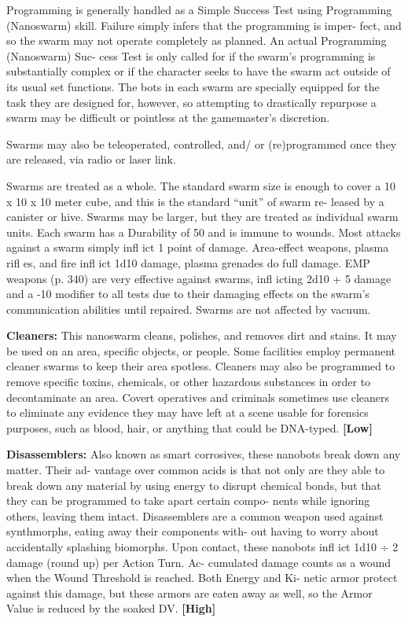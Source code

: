 Programming is generally handled as a Simple 
Success Test using Programming (Nanoswarm) skill. 
Failure simply infers that the programming is imper-
fect, and so the swarm may not operate completely as 
planned. An actual Programming (Nanoswarm) Suc-
cess Test is only called for if the swarm's programming 
is substantially complex or if the character seeks to 
have the swarm act outside of its usual set functions. 
The bots in each swarm are specially equipped for the 
task they are designed for, however, so attempting 
to drastically repurpose a swarm may be difficult or 
pointless at the gamemaster's discretion.

Swarms may also be teleoperated, controlled, and/
or (re)programmed once they are released, via radio 
or laser link.

Swarms are treated as a whole. The standard 
swarm size is enough to cover a 10 x 10 x 10 meter 
cube, and this is the standard ``unit'' of swarm re-
leased by a canister or hive. Swarms may be larger, 
but they are treated as individual swarm units. Each 
swarm has a Durability of 50 and is immune to 
wounds. Most attacks against a swarm simply infl ict 
1 point of damage. Area-effect weapons, plasma rifl es, 
and fire infl ict 1d10 damage, plasma grenades do full 
damage. EMP weapons (p. 340) are very effective 
against swarms, infl icting 2d10 + 5 damage and a -10 
modifier to all tests due to their damaging effects on 
the swarm's communication abilities until repaired. 
Swarms are not affected by vacuum.

\textbf{Cleaners:} This nanoswarm cleans, polishes, and 
removes dirt and stains. It may be used on an area, 
specific objects, or people. Some facilities employ 
permanent cleaner swarms to keep their area spotless. 
Cleaners may also be programmed to remove specific 
toxins, chemicals, or other hazardous substances in 
order to decontaminate an area. Covert operatives 
and criminals sometimes use cleaners to eliminate 
any evidence they may have left at a scene usable for 
forensics purposes, such as blood, hair, or anything 
that could be DNA-typed. \textbf{[Low]}

\textbf{Disassemblers:} Also known as smart corrosives, 
these nanobots break down any matter. Their ad-
vantage over common acids is that not only are 
they able to break down any material by using 
energy to disrupt chemical bonds, but that they 
can be programmed to take apart certain compo-
nents while ignoring others, leaving them intact. 
Disassemblers are a common weapon used against 
synthmorphs, eating away their components with-
out having to worry about accidentally splashing 
biomorphs. Upon contact, these nanobots infl ict 
1d10 ÷ 2 damage (round up) per Action Turn. Ac-
cumulated damage counts as a wound when the 
Wound Threshold is reached. Both Energy and Ki-
netic armor protect against this damage, but these 
armors are eaten away as well, so the Armor Value 
is reduced by the soaked DV. \textbf{[High]}


